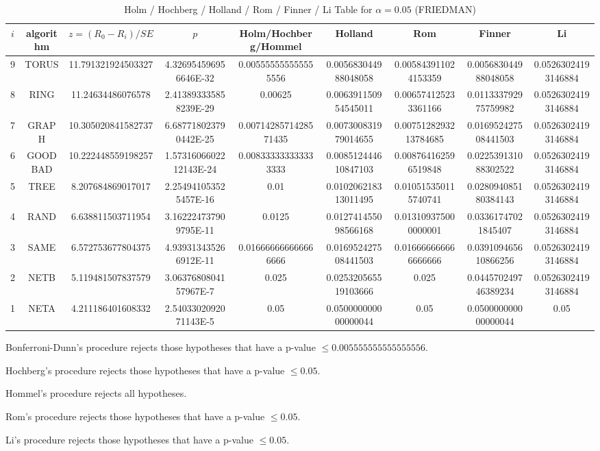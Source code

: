 \documentclass[a4paper,10pt]{article}
\begin{document}
\begin{landscape}
\begin{table}[!htp]
\centering\scriptsize
\caption{Holm / Hochberg / Holland / Rom / Finner / Li Table for $\alpha=0.05$ (FRIEDMAN)}
\begin{tabular}{ccccccccc}
$i$&algorithm&$z=(R_0 - R_i)/SE$&$p$&Holm/Hochberg/Hommel&Holland&Rom&Finner&Li\\
\hline
9& TORUS&11.791321924503327&4.326954596956646E-32&0.005555555555555556&0.005683044988048058&0.005843911024153359&0.005683044988048058&0.05263024193146884\\
8& RING&11.24634486076578&2.413893335858239E-29&0.00625&0.006391150954545011&0.006574125233361166&0.011333792975759982&0.05263024193146884\\
7& GRAPH&10.305020841582737&6.687718023790442E-25&0.0071428571428571435&0.007300831979014655&0.0075128293213784685&0.016952427508441503&0.05263024193146884\\
6& GOODBAD&10.222448559198257&1.5731606602212143E-24&0.008333333333333333&0.008512444610847103&0.008764162596519848&0.022539131088302522&0.05263024193146884\\
5& TREE&8.207684869017017&2.254941053525457E-16&0.01&0.010206218313011495&0.010515350115740741&0.028094085180384143&0.05263024193146884\\
4& RAND&6.638811503711954&3.162224737909795E-11&0.0125&0.012741455098566168&0.013109375000000001&0.03361747021845407&0.05263024193146884\\
3& SAME&6.572753677804375&4.939313435266912E-11&0.016666666666666666&0.016952427508441503&0.016666666666666666&0.039109465610866256&0.05263024193146884\\
2& NETB&5.119481507837579&3.0637680804157967E-7&0.025&0.025320565519103666&0.025&0.044570249746389234&0.05263024193146884\\
1& NETA&4.211186401608332&2.5403302092071143E-5&0.05&0.050000000000000044&0.05&0.050000000000000044&0.05\\
\hline
\end{tabular}
\end{table}
Bonferroni-Dunn's procedure rejects those hypotheses that have a p-value $\le0.005555555555555556$.


Hochberg's procedure rejects those hypotheses that have a p-value $\le0.05$.


Hommel's procedure rejects all hypotheses.


Rom's procedure rejects those hypotheses that have a p-value $\le0.05$.


Li's procedure rejects those hypotheses that have a p-value $\le0.05$.




\end{landscape}
\end{document}

